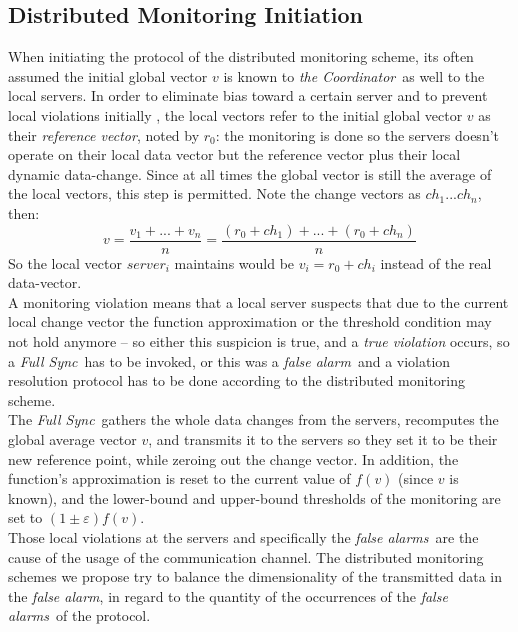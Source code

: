 \documentclass[10pt, conference]{IEEEtran}
\newcommand{\fullSync}{\textit{Full Sync}}
\newcommand{\falseAlarm}{\textit{false alarm}}
\newcommand{\falseAlarms}{\textit{false alarms}}
\newcommand{\theCoordinator}{\textit{the Coordinator}}
\begin{document}
\subsection{Distributed Monitoring Initiation}
When initiating the protocol of the distributed monitoring scheme, its often assumed the initial global vector $v$ is known to \theCoordinator \ as well to the local servers. In order to eliminate bias toward a certain server and to prevent local violations initially \cite{sharfman2007geometric},  the local vectors refer to the initial global vector $v$ as their \textit{reference vector}, noted by $r_0$: the monitoring is done so the servers doesn't operate on their local data vector but the reference vector plus their local dynamic data-change. Since at all times the global vector is still the average of the local vectors, this step is permitted. Note the change vectors as ${ch_1 ... ch_n}$, then: \\
\begin{equation}
v = \frac{v_1+...+ v_n}{n} = \frac{(r_0+ch_1)+...+(r_0+ch_n)}{n}
\end{equation}
So the local vector $server_i$ maintains would be $v_i = r_0 + ch_i$ instead of the real data-vector. \\
A monitoring violation means that a local server suspects that due to the current local change vector the function approximation or the threshold condition may not hold anymore -- so either this suspicion is true, and a \textit{true violation} occurs, so a \fullSync \ has to be invoked, or this was a \falseAlarm \ and a violation resolution protocol has to be done according to the distributed monitoring scheme. \\
The \fullSync \ gathers the whole data changes from the servers, recomputes the global average vector $v$, and transmits it to the servers so they set it to be their new reference point, while zeroing out the change vector. In addition, the function's approximation is reset to the current value of $f(v)$ (since $v$ is known), and the lower-bound and upper-bound thresholds of the monitoring are set to ${(1 \pm \varepsilon )f(v)}$. \\
Those local violations at the servers and specifically the \falseAlarms \ are the cause of the usage of the communication channel. The distributed monitoring schemes we propose try to balance the dimensionality of the transmitted data in the \falseAlarm , in regard to the quantity of the occurrences of the \falseAlarms \ of the protocol.
\end{document}
